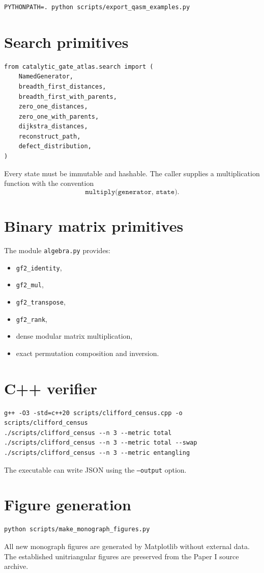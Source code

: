 \begin{verbatim}
PYTHONPATH=. python scripts/export_qasm_examples.py
\end{verbatim}

\section{Search primitives}
\begin{lstlisting}[style=pythonstyle]
from catalytic_gate_atlas.search import (
    NamedGenerator,
    breadth_first_distances,
    breadth_first_with_parents,
    zero_one_distances,
    zero_one_with_parents,
    dijkstra_distances,
    reconstruct_path,
    defect_distribution,
)
\end{lstlisting}
Every state must be immutable and hashable.  The caller supplies a multiplication function with the convention
\[
\texttt{multiply(generator, state)}.
\]

\section{Binary matrix primitives}
The module \texttt{algebra.py} provides:
\begin{itemize}
\item \texttt{gf2\_identity},
\item \texttt{gf2\_mul},
\item \texttt{gf2\_transpose},
\item \texttt{gf2\_rank},
\item dense modular matrix multiplication,
\item exact permutation composition and inversion.
\end{itemize}

\section{C++ verifier}
\begin{verbatim}
g++ -O3 -std=c++20 scripts/clifford_census.cpp -o scripts/clifford_census
./scripts/clifford_census --n 3 --metric total
./scripts/clifford_census --n 3 --metric total --swap
./scripts/clifford_census --n 3 --metric entangling
\end{verbatim}
The executable can write JSON using the \texttt{--output} option.

\section{Figure generation}
\begin{verbatim}
python scripts/make_monograph_figures.py
\end{verbatim}
All new monograph figures are generated by Matplotlib without external data.  The established unitriangular figures are preserved from the Paper I source archive.

